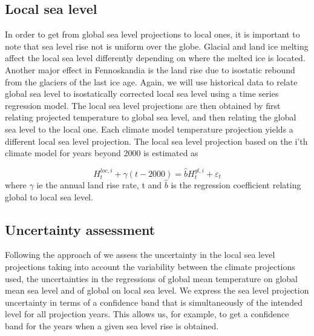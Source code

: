 \documentclass[draft,linenumbers]{agujournal}
\begin{document}
\subsection{Local sea level}
In order to get from global sea level projections to local ones, it is important to note that sea level rise not is uniform over the globe. Glacial and land ice melting affect the local sea level differently depending on where the melted ice is located.
Another major effect in Fennoskandia is the land rise due to isostatic rebound from the glaciers of the last ice age. 
Again, we will use historical data to relate global sea level to isostatically corrected local sea level using a time series regression model. 
The local sea level projections are then obtained by first relating projected temperature to global sea level, and then relating the global sea level to the local one. Each climate model temperature projection yields a different local sea level projection. The local sea level projection based on the i'th climate model for years beyond 2000 is estimated as

\[H_t^{loc,i} + \gamma (t -2000 ) = {\hat b} H_t^{gl,i}  + {\varepsilon _t}\]
where $\gamma$ ie the annual land rise rate, t and $ {\hat b} $ is the regression coefficient relating global to local sea level.



\subsection{Uncertainty assessment}
\label{unc_ass}
Following the approach of \citet{Guttorp2014} we assess the uncertainty in the local sea level projections taking into account the variability between the climate projections used, the uncertainties in the regressions of global mean temperature on global mean sea level and of global on local sea level. We express the sea level projection uncertainty in terms of a confidence band that is simultaneously of the intended  level  for all projection years. This allows us, for example, to get a confidence band for the years when a given sea level rise is obtained. 
\end{document}
